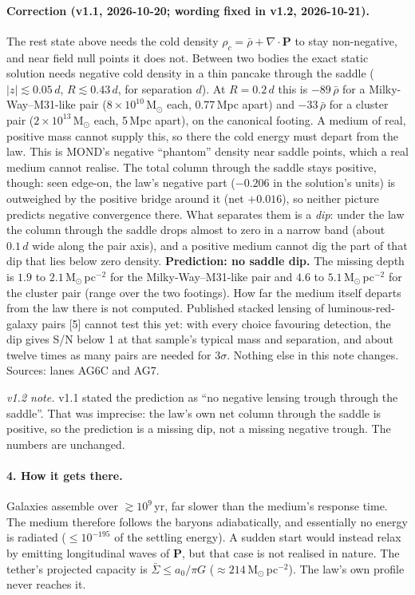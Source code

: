 \documentclass[10pt]{article}
\begin{document}
\paragraph{Correction (v1.1, 2026-10-20; wording fixed in v1.2, 2026-10-21).} The rest state above needs the cold density $\rho_c=\bar\rho+\nabla\!\cdot\!\mathbf P$ to stay non-negative, and near field null points it does not. Between two bodies the exact static solution needs negative cold density in a thin pancake through the saddle ($|z|\lesssim0.05\,d$, $R\lesssim0.43\,d$, for separation $d$). At $R=0.2\,d$ this is $-89\,\bar\rho$ for a Milky-Way--M31-like pair ($8\times10^{10}$\,M$_\odot$ each, 0.77\,Mpc apart) and $-33\,\bar\rho$ for a cluster pair ($2\times10^{13}$\,M$_\odot$ each, 5\,Mpc apart), on the canonical footing. A medium of real, positive mass cannot supply this, so there the cold energy must depart from the law. This is MOND's negative ``phantom'' density near saddle points, which a real medium cannot realise. The total column through the saddle stays positive, though: seen edge-on, the law's negative part ($-0.206$ in the solution's units) is outweighed by the positive bridge around it (net $+0.016$), so neither picture predicts negative convergence there. What separates them is a \emph{dip}: under the law the column through the saddle drops almost to zero in a narrow band (about $0.1\,d$ wide along the pair axis), and a positive medium cannot dig the part of that dip that lies below zero density. \textbf{Prediction: no saddle dip.} The missing depth is $1.9$ to $2.1$\,M$_\odot$\,pc$^{-2}$ for the Milky-Way--M31-like pair and $4.6$ to $5.1$\,M$_\odot$\,pc$^{-2}$ for the cluster pair (range over the two footings). How far the medium itself departs from the law there is not computed. Published stacked lensing of luminous-red-galaxy pairs [5] cannot test this yet: with every choice favouring detection, the dip gives S/N below 1 at that sample's typical mass and separation, and about twelve times as many pairs are needed for $3\sigma$. Nothing else in this note changes. Sources: lanes AG6C and AG7.

{\footnotesize\textit{v1.2 note.} v1.1 stated the prediction as ``no negative lensing trough through the saddle''. That was imprecise: the law's own net column through the saddle is positive, so the prediction is a missing dip, not a missing negative trough. The numbers are unchanged.}

\paragraph{4. How it gets there.} Galaxies assemble over $\gtrsim10^9$\,yr, far slower than the medium's response time. The medium therefore follows the baryons adiabatically, and essentially no energy is radiated ($\le10^{-195}$ of the settling energy). A sudden start would instead relax by emitting longitudinal waves of $\mathbf P$, but that case is not realised in nature. The tether's projected capacity is $\bar\Sigma\le a_0/\pi G$ ($\approx214$\,M$_\odot$\,pc$^{-2}$). The law's own profile never reaches it.
\end{document}
